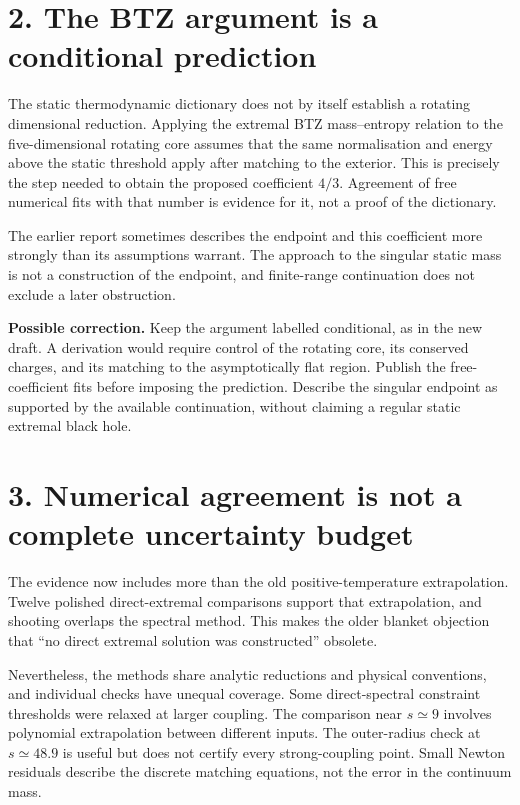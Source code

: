 \documentclass[11pt,a4paper]{article}
\begin{document}
\section*{2. The BTZ argument is a conditional prediction}
The static thermodynamic dictionary does not by itself establish a rotating dimensional reduction. Applying the extremal BTZ mass--entropy relation to the five-dimensional rotating core assumes that the same normalisation and energy above the static threshold apply after matching to the exterior. This is precisely the step needed to obtain the proposed coefficient $4/3$. Agreement of free numerical fits with that number is evidence for it, not a proof of the dictionary.

The earlier report sometimes describes the endpoint and this coefficient more strongly than its assumptions warrant. The approach to the singular static mass is not a construction of the endpoint, and finite-range continuation does not exclude a later obstruction.

\textbf{Possible correction.} Keep the argument labelled conditional, as in the new draft. A derivation would require control of the rotating core, its conserved charges, and its matching to the asymptotically flat region. Publish the free-coefficient fits before imposing the prediction. Describe the singular endpoint as supported by the available continuation, without claiming a regular static extremal black hole.

\section*{3. Numerical agreement is not a complete uncertainty budget}
The evidence now includes more than the old positive-temperature extrapolation. Twelve polished direct-extremal comparisons support that extrapolation, and shooting overlaps the spectral method. This makes the older blanket objection that ``no direct extremal solution was constructed'' obsolete.

Nevertheless, the methods share analytic reductions and physical conventions, and individual checks have unequal coverage. Some direct-spectral constraint thresholds were relaxed at larger coupling. The comparison near $s\simeq9$ involves polynomial extrapolation between different inputs. The outer-radius check at $s\simeq48.9$ is useful but does not certify every strong-coupling point. Small Newton residuals describe the discrete matching equations, not the error in the continuum mass.
\end{document}
